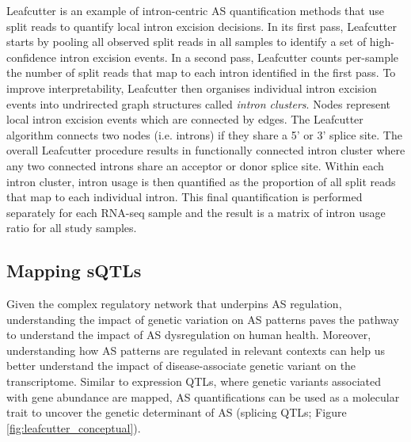 Leafcutter is an example of intron-centric AS quantification methods that use split reads to quantify local intron excision decisions. In its first pass, Leafcutter starts by pooling all observed split reads in all samples to identify a set of high-confidence intron excision events. In a second pass, Leafcutter counts per-sample the number of split reads that map to each intron identified in the first pass. To improve interpretability, Leafcutter then organises individual intron excision events into undrirected graph structures called \textit{intron clusters}. Nodes represent local intron excision events which are connected by edges. The Leafcutter algorithm connects two nodes (i.e. introns) if they share a 5' or 3' splice site. The overall Leafcutter procedure results in functionally connected intron cluster where any two connected introns share an acceptor or donor splice site. Within each intron cluster, intron usage is then quantified as the proportion of all split reads that map to each individual intron. This final quantification is performed separately for each RNA-seq sample and the result is a matrix of intron usage ratio for all study samples. 



\subsection{Mapping sQTLs}

Given the complex regulatory network that underpins AS regulation, understanding the impact of genetic variation on AS patterns paves the pathway to understand the impact of AS dysregulation on human health. Moreover, understanding how AS patterns are regulated in relevant contexts can help us better understand the impact of disease-associate genetic variant on the transcriptome. Similar to expression QTLs, where genetic variants associated with gene abundance are mapped, AS quantifications can be used as a molecular trait to uncover the genetic determinant of AS (splicing QTLs; Figure \ref{fig:leafcutter_conceptual}).\\

